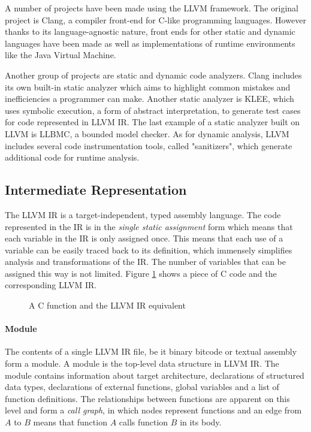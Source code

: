 A number of projects have been made using the {LLVM} framework. The original project is Clang, a compiler front-end for C-like programming languages. However thanks to its language-agnostic nature, front ends for other static and dynamic languages have been made as well as implementations of runtime environments like the Java Virtual Machine.

Another group of projects are static and dynamic code analyzers. Clang includes its own built-in static analyzer which aims to highlight common mistakes and inefficiencies a programmer can make. Another static analyzer is {KLEE}, which uses symbolic execution, a form of abstract interpretation, to generate test cases for code represented in {LLVM IR}. The last example of a static analyzer built on {LLVM} is {LLBMC}, a bounded model checker. As for dynamic analysis, {LLVM} includes several code instrumentation tools, called "sanitizers", which generate additional code for runtime analysis.

\subsection{Intermediate Representation}
The {LLVM IR} is a target-independent, typed assembly language. The code represented in the IR is in the \emph{single static assignment} form which means that each variable in the IR is only assigned once. This means that each use of a variable can be easily traced back to its definition, which immensely simplifies analysis and transformations of the IR. The number of variables that can be assigned this way is not limited. Figure \ref{fig_llvmir} shows a piece of C code and the corresponding {LLVM IR}.

\begin{figure}[H]
    \centering
    \caption{A C function and the {LLVM IR} equivalent}
    \label{fig_llvmir}
\end{figure}

\paragraph*{Module} The contents of a single {LLVM IR} file, be it binary bitcode or textual assembly form a module. A module is the top-level data structure in {LLVM IR}. The module contains information about target architecture, declarations of structured data types, declarations of external functions, global variables and a list of function definitions. The relationships between functions are apparent on this level and form a \emph{call graph}, in which nodes represent functions and an edge from $A$ to $B$ means that function $A$ calls function $B$ in its body.

